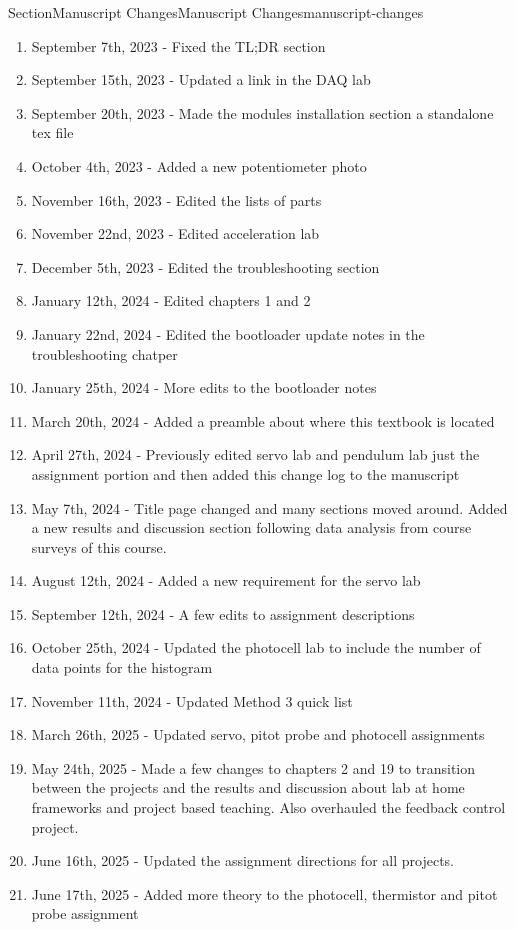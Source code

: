 \documentclass[oneside,10pt,]{book}
\numberwithin{equation}{section}
\begin{document}
\begin{sectionptx}{Section}{Manuscript Changes}{}{Manuscript Changes}{}{}{manuscript-changes}
\begin{enumerate}
\item{}September 7th, 2023 - Fixed the TL;DR section%
\item{}September 15th, 2023 - Updated a link in the DAQ lab%
\item{}September 20th, 2023 - Made the modules installation section a standalone tex file%
\item{}October 4th, 2023 - Added a new potentiometer photo%
\item{}November 16th, 2023 - Edited the lists of parts%
\item{}November 22nd, 2023 - Edited acceleration lab%
\item{}December 5th, 2023 - Edited the troubleshooting section%
\item{}January 12th, 2024 - Edited chapters 1 and 2%
\item{}January 22nd, 2024 - Edited the bootloader update notes in the troubleshooting chatper%
\item{}January 25th, 2024 - More edits to the bootloader notes%
\item{}March 20th, 2024 - Added a preamble about where this textbook is located%
\item{}April 27th, 2024 - Previously edited servo lab and pendulum lab just the assignment portion and then added this change log to the manuscript%
\item{}May 7th, 2024 - Title page changed and many sections moved around. Added a new results and discussion section following data analysis from course surveys of this course.%
\item{}August 12th, 2024 - Added a new requirement for the servo lab%
\item{}September 12th, 2024 - A few edits to assignment descriptions%
\item{}October 25th, 2024 - Updated the photocell lab to include the number of data points for the histogram%
\item{}November 11th, 2024 - Updated Method 3 quick list%
\item{}March 26th, 2025 - Updated servo, pitot probe and photocell assignments%
\item{}May 24th, 2025 - Made a few changes to chapters 2 and 19 to transition between the projects and the results and discussion about lab at home frameworks and project based teaching. Also overhauled the feedback control project.%
\item{}June 16th, 2025 - Updated the assignment directions for all projects.%
\item{}June 17th, 2025 - Added more theory to the photocell, thermistor and pitot probe assignment%

\end{enumerate}
\end{sectionptx}
\end{document}
